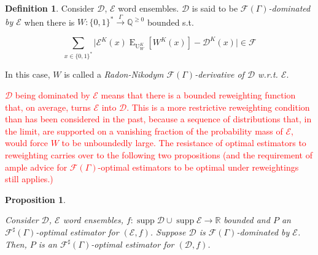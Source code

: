 \documentclass[11pt]{article}
\numberwithin{equation}{section}
\theoremstyle{definition}
\newtheorem{definition}{Definition}[section]
\theoremstyle{plain}
\newtheorem{proposition}{Proposition}[section]
\newcommand{\Bool}{\{0,1\}}
\newcommand{\Words}{{\Bool^*}}
\DeclareMathOperator{\Supp}{supp}
\DeclareMathOperator{\E}{E}
\DeclareMathOperator{\Un}{U}
\newcommand{\Rats}{\mathbb{Q}}
\newcommand{\Reals}{\mathbb{R}}
\newcommand{\Abs}[1]{\lvert #1 \rvert}
\newcommand{\Dist}{\mathcal{D}}
\newcommand{\Fall}{\mathcal{F}}
\newcommand{\EG}{\Fall(\Gamma)}
\newcommand{\ESG}{\Fall^\sharp(\Gamma)}
\newcommand{\Scheme}{\xrightarrow{\Gamma}}
\begin{document}
\begin{samepage}
\begin{definition}

Consider ${\Dist}$, ${\mathcal{E}}$ word ensembles. ${\Dist}$ is said to be \emph{${\EG}$-dominated by ${\mathcal{E}}$} when there is ${W: \Words \Scheme \Rats^{\geq 0}}$ bounded s.t.

\begin{equation}
\sum_{x \in \Words} \Abs{\mathcal{E}^{K}(x)\E_{\Un_W^K}[W^K(x)]-\Dist^{K}(x)} \in \Fall
\end{equation}

In this case, ${W}$ is called a \emph{Radon-Nikodym ${\EG}$-derivative of ${\Dist}$ w.r.t. ${\mathcal{E}}$}.

\textcolor{red}{${\Dist}$ being dominated by ${\mathcal{E}}$ means that there is a bounded reweighting function that, on average, turns ${\mathcal{E}}$ into $\Dist$. This is a more restrictive reweighting condition than has been considered in the past, because a sequence of distributions that, in the limit, are supported on a vanishing fraction of the probability mass of $\mathcal{E}$, would force $W$ to be unboundedly large. The resistance of optimal estimators to reweighting carries over to the following two propositions (and the requirement of ample advice for $\EG$-optimal estimators to be optimal under reweightings still applies.) }
\end{definition}
\end{samepage}

\begin{samepage}
\begin{proposition}
\label{prp:dom_reduce_sharp}

Consider ${\Dist}$, ${\mathcal{E}}$ word ensembles, ${f: \Supp \Dist \cup \Supp \mathcal{E} \rightarrow \Reals}$ bounded and ${P}$ an ${\ESG}$-optimal estimator for ${(\mathcal{E},f)}$. Suppose ${\Dist}$ is ${\EG}$-dominated by ${\mathcal{E}}$. Then, ${P}$ is an ${\ESG}$-optimal estimator for ${(\Dist,f)}$.

\end{proposition}
\end{samepage}
\end{document}
